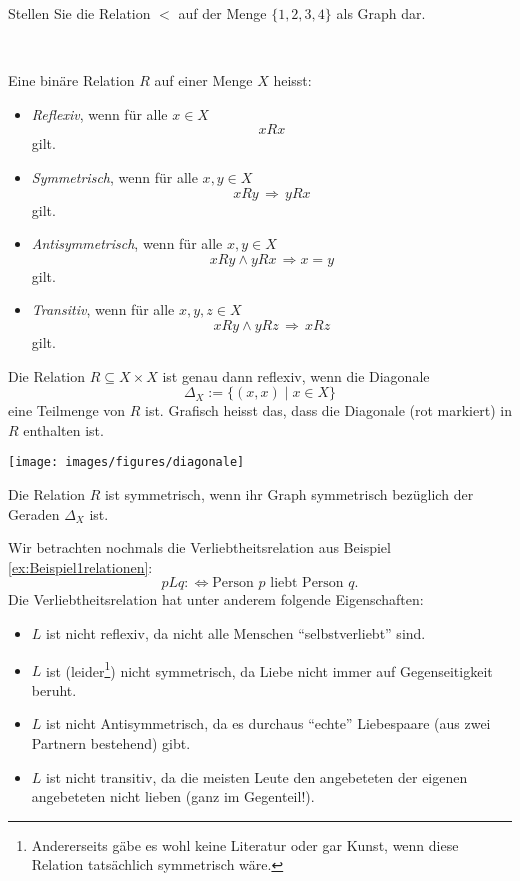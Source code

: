 \begin{ueb}
    Stellen Sie die Relation $<$ auf der Menge $\{1,2,3,4\}$ als Graph dar.
\end{ueb}
\begin{lsg}~
    {~\answerspace{5cm}}
\end{lsg}

\begin{df}
Eine binäre Relation $R$ auf einer Menge $X$ heisst:
\begin{itemize}
\item \textit{Reflexiv}, wenn für alle $x\in X$
\[
xRx
\]
gilt.
\item \textit{Symmetrisch}, wenn für alle $x,y\in X$
\[
xRy\,\Rightarrow\, yRx
\]
gilt.
\item \textit{Antisymmetrisch}, wenn für alle $x,y\in X$
\[
xRy\land yRx\,\Rightarrow x=y
\]
gilt.
\item \textit{Transitiv}, wenn für alle $x,y,z\in X$
\[
xRy\land yRz\,\Rightarrow \, xRz
\]
gilt.
\end{itemize}
\end{df}


\begin{rk}
Die Relation $R\subseteq X\times X$ ist genau dann reflexiv, wenn die Diagonale
\[
\Delta_X:=\{(x,x)\mid x\in X \}
\]
eine Teilmenge von $R$ ist. Grafisch heisst das, dass die Diagonale (rot markiert) in $R$ enthalten ist.
\begin{center}
\texttt{[image: images/figures/diagonale]}
\end{center}
Die Relation $R$ ist symmetrisch, wenn ihr Graph symmetrisch bezüglich der Geraden $\Delta_X$ ist.
\end{rk}


\begin{bsp}
	Wir betrachten nochmals die Verliebtheitsrelation aus Beispiel \ref{ex:Beispiel1relationen}:
	\[
	pLq:\Leftrightarrow \text{Person $p$ liebt Person $q$.}
	\]
Die Verliebtheitsrelation hat unter anderem folgende Eigenschaften:
\begin{itemize}
	\item $L$ ist nicht reflexiv, da nicht alle Menschen ``selbstverliebt'' sind.
	\item $L$ ist (leider\footnote{Andererseits gäbe es wohl keine Literatur oder gar Kunst, wenn diese Relation tatsächlich symmetrisch wäre.}) nicht symmetrisch, da Liebe nicht immer auf Gegenseitigkeit beruht.
	\item $L$ ist nicht Antisymmetrisch, da es durchaus ``echte'' Liebespaare (aus zwei Partnern bestehend) gibt.
	\item $L$ ist nicht transitiv, da die meisten Leute den angebeteten der eigenen angebeteten nicht lieben (ganz im Gegenteil!).
\end{itemize}
\end{bsp}

